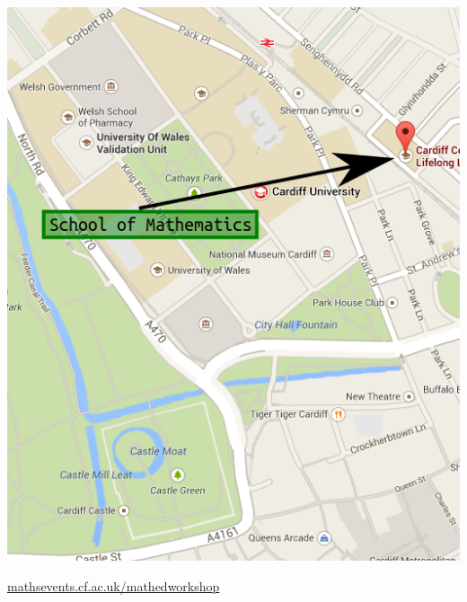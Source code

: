 \documentclass {leaflet}
\begin{document}
\begin{center}
\includegraphics[width=.8\textwidth]{./Images/map.png}

\vspace{1cm}
\url{mathsevents.cf.ac.uk/mathedworkshop}
\end{center}

\loggingall
\end{document}
